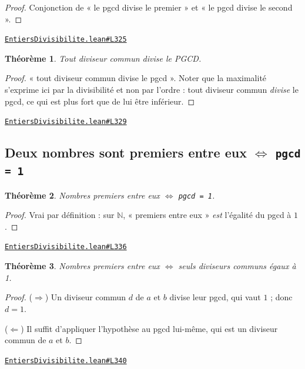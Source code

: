 \documentclass[11pt,a4paper]{article}
\theoremstyle{definition}
\theoremstyle{plain}
\newtheorem{theoreme}{Théorème}
\newcommand{\source}[2]{\par\smallskip\noindent\hfill{\footnotesize\href{#1}{\texttt{#2}}}\par\smallskip}
\begin{document}
\begin{proof}
Conjonction de « le pgcd divise le premier » et « le pgcd divise le second ».
\end{proof}
\source{https://github.com/Commutator-IO/learn-lean/blob/main/cours/01-college/01-nombres-et-calculs/EntiersDivisibilite.lean\#L325}{EntiersDivisibilite.lean\#L325}

\begin{theoreme}
Tout diviseur commun divise le PGCD.
\end{theoreme}

\begin{proof}
« tout diviseur commun divise le pgcd ». Noter que la maximalité s'exprime ici par la divisibilité et non
par l'ordre : tout diviseur commun \emph{divise} le pgcd, ce qui est plus fort que de lui
être inférieur.
\end{proof}
\source{https://github.com/Commutator-IO/learn-lean/blob/main/cours/01-college/01-nombres-et-calculs/EntiersDivisibilite.lean\#L329}{EntiersDivisibilite.lean\#L329}

\subsection{Deux nombres sont premiers entre eux \(\iff\) \texttt{pgcd = 1}}

\begin{theoreme}
Nombres premiers entre eux \(\iff\) \texttt{pgcd = 1}.
\end{theoreme}

\begin{proof}
Vrai par définition : sur $\mathbb{N}$, « premiers entre eux » \emph{est} l'égalité du
pgcd à $1$.
\end{proof}
\source{https://github.com/Commutator-IO/learn-lean/blob/main/cours/01-college/01-nombres-et-calculs/EntiersDivisibilite.lean\#L336}{EntiersDivisibilite.lean\#L336}

\begin{theoreme}
Nombres premiers entre eux \(\iff\) seuls diviseurs communs égaux à 1.
\end{theoreme}

\begin{proof}
($\Rightarrow$) Un diviseur commun $d$ de $a$ et $b$ divise leur pgcd, qui vaut $1$ ;
donc $d = 1$.

($\Leftarrow$) Il suffit d'appliquer l'hypothèse au pgcd lui-même, qui est un diviseur
commun de $a$ et $b$.
\end{proof}
\source{https://github.com/Commutator-IO/learn-lean/blob/main/cours/01-college/01-nombres-et-calculs/EntiersDivisibilite.lean\#L340}{EntiersDivisibilite.lean\#L340}
\end{document}
